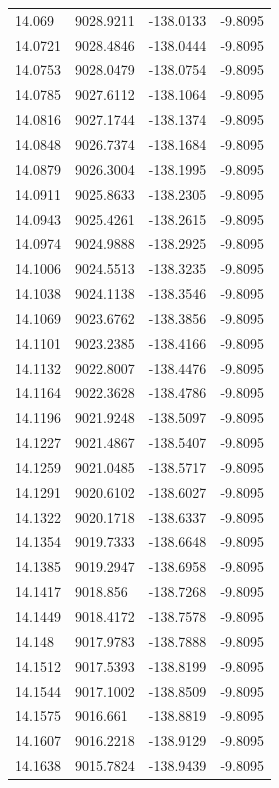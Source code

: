 \begin{table}[H]
\begin{tabular}{llll}
14.069 & 9028.9211 & -138.0133 & -9.8095 \\
14.0721 & 9028.4846 & -138.0444 & -9.8095 \\
14.0753 & 9028.0479 & -138.0754 & -9.8095 \\
14.0785 & 9027.6112 & -138.1064 & -9.8095 \\
14.0816 & 9027.1744 & -138.1374 & -9.8095 \\
14.0848 & 9026.7374 & -138.1684 & -9.8095 \\
14.0879 & 9026.3004 & -138.1995 & -9.8095 \\
14.0911 & 9025.8633 & -138.2305 & -9.8095 \\
14.0943 & 9025.4261 & -138.2615 & -9.8095 \\
14.0974 & 9024.9888 & -138.2925 & -9.8095 \\
14.1006 & 9024.5513 & -138.3235 & -9.8095 \\
14.1038 & 9024.1138 & -138.3546 & -9.8095 \\
14.1069 & 9023.6762 & -138.3856 & -9.8095 \\
14.1101 & 9023.2385 & -138.4166 & -9.8095 \\
14.1132 & 9022.8007 & -138.4476 & -9.8095 \\
14.1164 & 9022.3628 & -138.4786 & -9.8095 \\
14.1196 & 9021.9248 & -138.5097 & -9.8095 \\
14.1227 & 9021.4867 & -138.5407 & -9.8095 \\
14.1259 & 9021.0485 & -138.5717 & -9.8095 \\
14.1291 & 9020.6102 & -138.6027 & -9.8095 \\
14.1322 & 9020.1718 & -138.6337 & -9.8095 \\
14.1354 & 9019.7333 & -138.6648 & -9.8095 \\
14.1385 & 9019.2947 & -138.6958 & -9.8095 \\
14.1417 & 9018.856 & -138.7268 & -9.8095 \\
14.1449 & 9018.4172 & -138.7578 & -9.8095 \\
14.148 & 9017.9783 & -138.7888 & -9.8095 \\
14.1512 & 9017.5393 & -138.8199 & -9.8095 \\
14.1544 & 9017.1002 & -138.8509 & -9.8095 \\
14.1575 & 9016.661 & -138.8819 & -9.8095 \\
14.1607 & 9016.2218 & -138.9129 & -9.8095 \\
14.1638 & 9015.7824 & -138.9439 & -9.8095 \\

\end{tabular}
\end{table}
